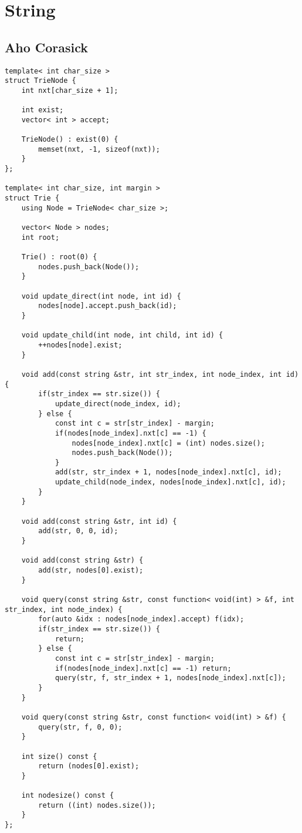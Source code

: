 \documentclass[10pt]{article}
\begin{document}
\section{String}
\subsection{Aho Corasick}
\begin{lstlisting}
template< int char_size >
struct TrieNode {
	int nxt[char_size + 1];

	int exist;
	vector< int > accept;

	TrieNode() : exist(0) {
		memset(nxt, -1, sizeof(nxt));
	}
};

template< int char_size, int margin >
struct Trie {
	using Node = TrieNode< char_size >;

	vector< Node > nodes;
	int root;

	Trie() : root(0) {
		nodes.push_back(Node());
	}

	void update_direct(int node, int id) {
		nodes[node].accept.push_back(id);
	}

	void update_child(int node, int child, int id) {
		++nodes[node].exist;
	}

	void add(const string &str, int str_index, int node_index, int id) {
		if(str_index == str.size()) {
			update_direct(node_index, id);
		} else {
			const int c = str[str_index] - margin;
			if(nodes[node_index].nxt[c] == -1) {
				nodes[node_index].nxt[c] = (int) nodes.size();
				nodes.push_back(Node());
			}
			add(str, str_index + 1, nodes[node_index].nxt[c], id);
			update_child(node_index, nodes[node_index].nxt[c], id);
		}
	}

	void add(const string &str, int id) {
		add(str, 0, 0, id);
	}

	void add(const string &str) {
		add(str, nodes[0].exist);
	}

	void query(const string &str, const function< void(int) > &f, int str_index, int node_index) {
		for(auto &idx : nodes[node_index].accept) f(idx);
		if(str_index == str.size()) {
			return;
		} else {
			const int c = str[str_index] - margin;
			if(nodes[node_index].nxt[c] == -1) return;
			query(str, f, str_index + 1, nodes[node_index].nxt[c]);
		}
	}

	void query(const string &str, const function< void(int) > &f) {
		query(str, f, 0, 0);
	}

	int size() const {
		return (nodes[0].exist);
	}

	int nodesize() const {
		return ((int) nodes.size());
	}
};



\end{lstlisting}
\end{document}
